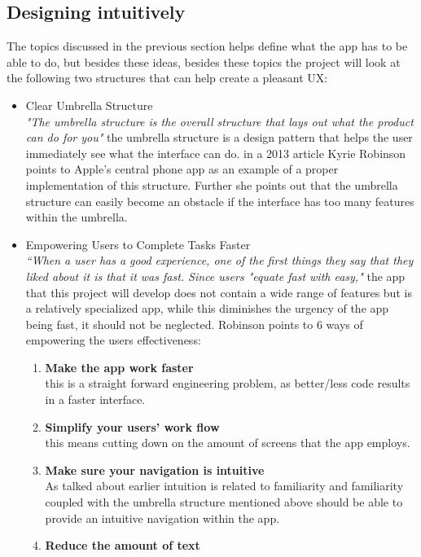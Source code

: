\subsection{ Designing intuitively  }
The topics discussed in the previous section helps define what the app has to be 
able to do, but besides these ideas, besides these topics the project will look 
at the following two structures that can help create a pleasant UX:
\begin{itemize}
\item Clear Umbrella Structure\\
\textit{"The umbrella structure is the overall structure that lays out what the 
product can do for you"}\cite{UXKeys} the umbrella structure is a design pattern 
that helps the user immediately see what the interface can do. in a 2013 article 
Kyrie Robinson points to Apple's central phone app as an example of a proper 
implementation of this structure. Further she points out that the umbrella 
structure can easily become an obstacle if the interface has too many features 
within the umbrella. 
\item  Empowering Users to Complete Tasks Faster\\
 \textit{“When a user has a good experience, one of the first things they say 
 that they liked about it is that it was fast. Since users "equate fast with 
 easy," }\cite{UXKeys} the app that this project will develop does not contain a 
 wide range of features but is a relatively specialized app, while this 
 diminishes the urgency of the app being fast, it should not be neglected. 
 Robinson points to 6 ways of empowering the users effectiveness\cite{UXKeys}:
 \begin{enumerate}
 \item \textbf{Make the app work faster}\\
 this is a straight forward engineering problem, as better/less code results in a 
 faster interface. 
 \item \textbf{Simplify your users’ work flow}\\
  this means cutting down on the amount of screens that the app employs.
 \item \textbf{Make sure your navigation is intuitive}\\\label{effectivenessP3}
 As talked about earlier intuition is related to familiarity and familiarity 
 coupled with the umbrella structure mentioned above should be able to provide an 
 intuitive navigation within the app.
 \item \textbf{Reduce the amount of text}\\

\end{enumerate}
\end{itemize}
